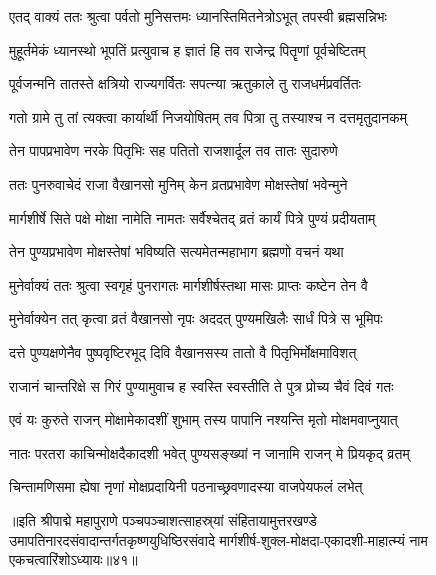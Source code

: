 \twolineshloka
{एतद् वाक्यं ततः श्रुत्वा पर्वतो मुनिसत्तमः}
{ध्यानस्तिमितनेत्रोऽभूत् तपस्वी ब्रह्मसन्निभः}%

\twolineshloka
{मुहूर्तमेकं ध्यानस्थो भूपतिं प्रत्युवाच ह}
{ज्ञातं हि तव राजेन्द्र पितॄणां पूर्वचेष्टितम्}%

\twolineshloka
{पूर्वजन्मनि तातस्ते क्षत्रियो राज्यगर्वितः}
{सपत्न्या ऋतुकाले तु राजधर्मप्रवर्तितः}%

\twolineshloka
{गतो ग्रामे तु तां त्यक्त्वा कार्यार्थी निजयोषितम्}
{तव पित्रा तु तस्याश्च न दत्तमृतुदानकम्}%

\twolineshloka
{तेन पापप्रभावेण नरके पितृभिः सह}
{पतितो राजशार्दूल तव तातः सुदारुणे}%

\twolineshloka
{ततः पुनरुवाचेदं राजा वैखानसो मुनिम्}
{केन व्रतप्रभावेण मोक्षस्तेषां भवेन्मुने}%


\twolineshloka
{मार्गशीर्षे सिते पक्षे मोक्षा नामेति नामतः}
{सर्वैश्चेतद् व्रतं कार्यं पित्रे पुण्यं प्रदीयताम्}%

\twolineshloka
{तेन पुण्यप्रभावेण मोक्षस्तेषां भविष्यति}
{सत्यमेतन्महाभाग ब्रह्मणो वचनं यथा}%

\twolineshloka
{मुनेर्वाक्यं ततः श्रुत्वा स्वगृहं पुनरागतः}
{मार्गशीर्षस्तथा मासः प्राप्तः कष्टेन तेन वै}%

\twolineshloka
{मुनेर्वाक्येन तत् कृत्वा व्रतं वैखानसो नृपः}
{अददत् पुण्यमखिलैः सार्धं पित्रे स भूमिपः}%

\twolineshloka
{दत्ते पुण्यक्षणेनैव पुष्पवृष्टिरभूद् दिवि}
{वैखानसस्य तातो वै पितृभिर्मोक्षमाविशत्}%

\twolineshloka
{राजानं चान्तरिक्षे स गिरं पुण्यामुवाच ह}
{स्वस्ति स्वस्तीति ते पुत्र प्रोच्य चैवं दिवं गतः}%

\twolineshloka
{एवं यः कुरुते राजन् मोक्षामेकादशीं शुभाम्}
{तस्य पापानि नश्यन्ति मृतो मोक्षमवाप्नुयात्}%

\twolineshloka
{नातः परतरा काचिन्मोक्षदैकादशी भवेत्}
{पुण्यसङ्ख्यां न जानामि राजन् मे प्रियकृद् व्रतम्}%

\twolineshloka
{चिन्तामणिसमा ह्येषा नृणां मोक्षप्रदायिनी}
{पठनाच्छ्रवणादस्या वाजपेयफलं लभेत्}%

॥इति श्रीपाद्मे महापुराणे पञ्चपञ्चाशत्साहस्र्यां संहितायामुत्तरखण्डे उमापतिनारदसंवादान्तर्गतकृष्णयुधिष्ठिरसंवादे मार्गशीर्ष-शुक्ल-मोक्षदा-एकादशी-माहात्म्यं नाम एकचत्वारिंशोऽध्यायः॥४१॥

\genMangalaShloka

\hyperref[sec:ekadashi_mahatmyam_padma_puranam]{\closesub}
\clearpage

